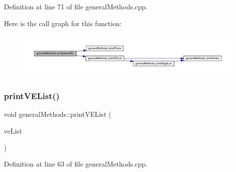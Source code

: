 Definition at line 71 of file general\+Methods.\+cpp.

Here is the call graph for this function\+:
\nopagebreak
\begin{figure}[H]
\begin{center}
\leavevmode
\includegraphics[width=350pt]{namespacegeneral_methods_adc8e104a2f2ed35a22be9a68051ec38d_cgraph}
\end{center}
\end{figure}
\mbox{\label{namespacegeneral_methods_a60a9e0ba058824389fc703dc2dbbb7e3}} 
\subsubsection{\texorpdfstring{print\+V\+E\+List()}{printVEList()}}
{\footnotesize\ttfamily void general\+Methods\+::print\+V\+E\+List (\begin{DoxyParamCaption}\item[{vertex\+Edge\+List}]{ve\+List }\end{DoxyParamCaption})}



Definition at line 63 of file general\+Methods.\+cpp.

